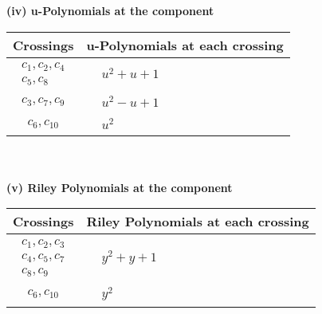 \documentclass[1p]{elsarticle_modified}
\theoremstyle{definition}
\begin{document}
\newpage\renewcommand{\arraystretch}{1}
\flushleft \textbf{(iv) u-Polynomials at the component}\newline \\
\begin{tabular}{m{50pt}|m{274pt}}
Crossings & \hspace{64pt}u-Polynomials at each crossing \\
\hline $$\begin{aligned}c_{1},c_{2},c_{4}\\c_{5},c_{8}\end{aligned}$$&$\begin{aligned}
&u^2+u+1
\end{aligned}$\\
\hline $$\begin{aligned}c_{3},c_{7},c_{9}\end{aligned}$$&$\begin{aligned}
&u^2- u+1
\end{aligned}$\\
\hline $$\begin{aligned}c_{6},c_{10}\end{aligned}$$&$\begin{aligned}
&u^2
\end{aligned}$\\
\hline
\end{tabular}\\~\\
\newpage\renewcommand{\arraystretch}{1}
\flushleft \textbf{(v) Riley Polynomials at the component}\newline \\
\begin{tabular}{m{50pt}|m{274pt}}
Crossings & \hspace{64pt}Riley Polynomials at each crossing \\
\hline $$\begin{aligned}c_{1},c_{2},c_{3}\\c_{4},c_{5},c_{7}\\c_{8},c_{9}\end{aligned}$$&$\begin{aligned}
&y^2+y+1
\end{aligned}$\\
\hline $$\begin{aligned}c_{6},c_{10}\end{aligned}$$&$\begin{aligned}
&y^2
\end{aligned}$\\
\hline
\end{tabular}\\~\\
\end{document}
